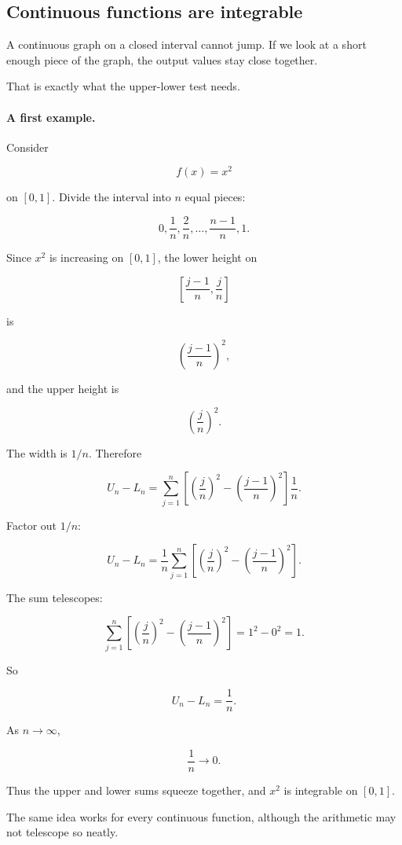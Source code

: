 \subsection{Continuous functions are integrable}
\label{subsec:continuous-functions-integrable}

A continuous graph on a closed interval cannot jump.  If we look at a short enough
piece of the graph, the output values stay close together.

That is exactly what the upper-lower test needs.

\paragraph{A first example.}
Consider

\[
f(x)=x^2
\]

on \([0,1]\).  Divide the interval into \(n\) equal pieces:

\[
0,\frac1n,\frac2n,\ldots,\frac{n-1}{n},1.
\]

Since \(x^2\) is increasing on \([0,1]\), the lower height on

\[
\left[\frac{j-1}{n},\frac{j}{n}\right]
\]

is

\[
\left(\frac{j-1}{n}\right)^2,
\]

and the upper height is

\[
\left(\frac{j}{n}\right)^2.
\]

The width is \(1/n\).  Therefore

\[
U_n-L_n
=
\sum_{j=1}^{n}
\left[
\left(\frac{j}{n}\right)^2
-
\left(\frac{j-1}{n}\right)^2
\right]\frac1n.
\]

Factor out \(1/n\):

\[
U_n-L_n
=
\frac1n
\sum_{j=1}^{n}
\left[
\left(\frac{j}{n}\right)^2
-
\left(\frac{j-1}{n}\right)^2
\right].
\]

The sum telescopes:

\[
\sum_{j=1}^{n}
\left[
\left(\frac{j}{n}\right)^2
-
\left(\frac{j-1}{n}\right)^2
\right]
=
1^2-0^2
=
1.
\]

So

\[
U_n-L_n=\frac1n.
\]

As \(n\to\infty\),

\[
\frac1n\to0.
\]

Thus the upper and lower sums squeeze together, and \(x^2\) is integrable on
\([0,1]\).

The same idea works for every continuous function, although the arithmetic may not
telescope so neatly.

